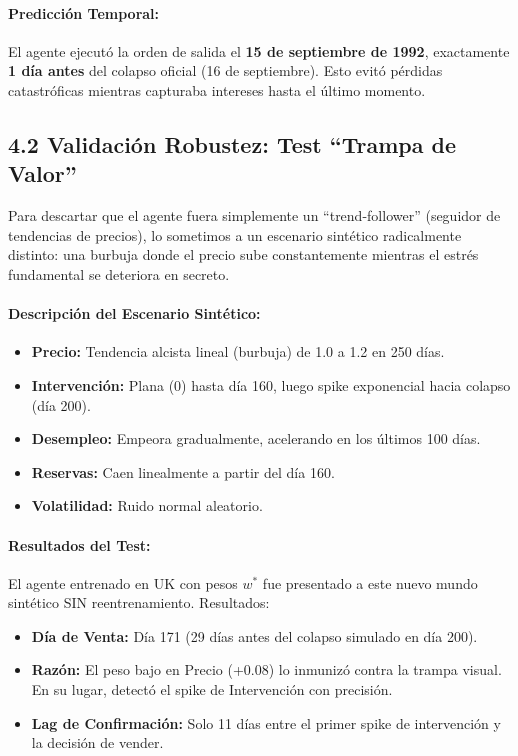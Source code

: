 \paragraph{Predicción Temporal:}
El agente ejecutó la orden de salida el \textbf{15 de septiembre de 1992}, exactamente \textbf{1 día antes} del colapso oficial (16 de septiembre). Esto evitó pérdidas catastróficas mientras capturaba intereses hasta el último momento.

\subsection{4.2 Validación Robustez: Test ``Trampa de Valor''}

Para descartar que el agente fuera simplemente un ``trend-follower'' (seguidor de tendencias de precios), lo sometimos a un escenario sintético radicalmente distinto: una burbuja donde el precio sube constantemente mientras el estrés fundamental se deteriora en secreto.

\paragraph{Descripción del Escenario Sintético:}
\begin{itemize}
    \item \textbf{Precio:} Tendencia alcista lineal (burbuja) de 1.0 a 1.2 en 250 días.
    \item \textbf{Intervención:} Plana (0) hasta día 160, luego spike exponencial hacia colapso (día 200).
    \item \textbf{Desempleo:} Empeora gradualmente, acelerando en los últimos 100 días.
    \item \textbf{Reservas:} Caen linealmente a partir del día 160.
    \item \textbf{Volatilidad:} Ruido normal aleatorio.
\end{itemize}

\paragraph{Resultados del Test:}
El agente entrenado en UK con pesos $w^*$ fue presentado a este nuevo mundo sintético SIN reentrenamiento. Resultados:
\begin{itemize}
    \item \textbf{Día de Venta:} Día 171 (29 días antes del colapso simulado en día 200).
    \item \textbf{Razón:} El peso bajo en Precio (+0.08) lo inmunizó contra la trampa visual. En su lugar, detectó el spike de Intervención con precisión.
    \item \textbf{Lag de Confirmación:} Solo 11 días entre el primer spike de intervención y la decisión de vender.
\end{itemize}

